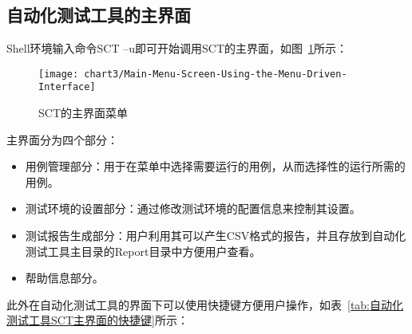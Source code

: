 	\subsection{自动化测试工具的主界面}
		
		Shell环境输入命令SCT –u即可开始调用SCT的主界面，如图~\ref{fig:Main-Menu-Screen-Using-the-Menu-Driven-Interface}所示：
		
		\begin{figure}[H] %
			\centering
			\texttt{[image: chart3/Main-Menu-Screen-Using-the-Menu-Driven-Interface]}
			\caption{SCT的主界面菜单}
			\label{fig:Main-Menu-Screen-Using-the-Menu-Driven-Interface}
		\end{figure}
		
		主界面分为四个部分：
		
		\begin{itemize}
			\item 用例管理部分：用于在菜单中选择需要运行的用例，从而选择性的运行所需的用例。
			\item 测试环境的设置部分：通过修改测试环境的配置信息来控制其设置。
			\item 测试报告生成部分：用户利用其可以产生CSV格式的报告，并且存放到自动化测试工具主目录的Report目录中方便用户查看。
			\item 帮助信息部分。
		\end{itemize}
		
		此外在自动化测试工具的界面下可以使用快捷键方便用户操作，如表~\ref{tab:自动化测试工具SCT主界面的快捷键}所示：
		
